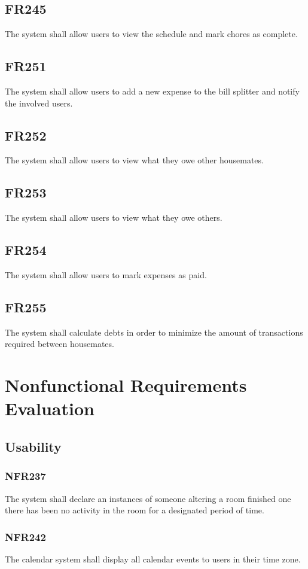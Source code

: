 \documentclass[12pt, titlepage]{article}
\begin{document}
\subsection{FR245}
The system shall allow users to view the schedule and mark chores as complete.

\subsection{FR251}
The system shall allow users to add a new expense to the bill splitter and notify the involved users.

\subsection{FR252}
The system shall allow users to view what they owe other housemates.

\subsection{FR253}
The system shall allow users to view what they owe others.

\subsection{FR254}
The system shall allow users to mark expenses as paid.

\subsection{FR255}
The system shall calculate debts in order to minimize the amount of transactions required between housemates.


\section{Nonfunctional Requirements Evaluation}
\subsection{Usability}
\subsubsection{NFR237}
The system shall declare an instances of someone altering a room
finished one there has been no activity in the room for a designated period
of time.
\subsubsection{NFR242}
The calendar system shall display all calendar events to users in
their time zone.
\end{document}
